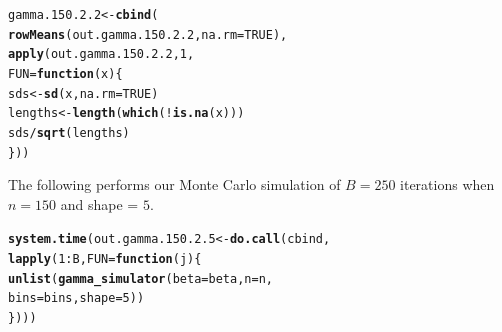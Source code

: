\documentclass[11pt]{article}\usepackage[]{graphicx}\usepackage[]{color}
\makeatletter
\newcommand{\hlnum}[1]{\textcolor[rgb]{0.686,0.059,0.569}{#1}}%
\newcommand{\hlopt}[1]{\textcolor[rgb]{0,0,0}{#1}}%
\newcommand{\hlstd}[1]{\textcolor[rgb]{0.345,0.345,0.345}{#1}}%
\newcommand{\hlkwa}[1]{\textcolor[rgb]{0.161,0.373,0.58}{\textbf{#1}}}%
\newcommand{\hlkwb}[1]{\textcolor[rgb]{0.69,0.353,0.396}{#1}}%
\newcommand{\hlkwc}[1]{\textcolor[rgb]{0.333,0.667,0.333}{#1}}%
\newcommand{\hlkwd}[1]{\textcolor[rgb]{0.737,0.353,0.396}{\textbf{#1}}}%
\newenvironment{kframe}{%
 \def\at@end@of@kframe{}%
 \ifinner\ifhmode%
  \def\at@end@of@kframe{\end{minipage}}%
  \begin{minipage}{\columnwidth}%
 \fi\fi%
 \def\FrameCommand##1{\hskip\@totalleftmargin \hskip-\fboxsep
 \colorbox{shadecolor}{##1}\hskip-\fboxsep
     \hskip-\linewidth \hskip-\@totalleftmargin \hskip\columnwidth}%
 \MakeFramed {\advance\hsize-\width
   \@totalleftmargin\z@ \linewidth\hsize
   \@setminipage}}%
 {\par\unskip\endMakeFramed%
 \at@end@of@kframe}
\newenvironment{knitrout}{}{} %
\makeatother
\begin{document}
\begin{knitrout}
\color{fgcolor}\begin{kframe}
\begin{alltt}
\hlstd{gamma.150.2.2} \hlkwb{<-} \hlkwd{cbind}\hlstd{(}
  \hlkwd{rowMeans}\hlstd{(out.gamma.150.2.2,} \hlkwc{na.rm} \hlstd{=} \hlnum{TRUE}\hlstd{),}
  \hlkwd{apply}\hlstd{(out.gamma.150.2.2,} \hlnum{1}\hlstd{,}
  \hlkwc{FUN} \hlstd{=} \hlkwa{function}\hlstd{(}\hlkwc{x}\hlstd{)\{}
    \hlstd{sds} \hlkwb{<-} \hlkwd{sd}\hlstd{(x,} \hlkwc{na.rm} \hlstd{=} \hlnum{TRUE}\hlstd{)}
    \hlstd{lengths} \hlkwb{<-} \hlkwd{length}\hlstd{(}\hlkwd{which}\hlstd{(}\hlopt{!}\hlkwd{is.na}\hlstd{(x)))}
    \hlstd{sds} \hlopt{/} \hlkwd{sqrt}\hlstd{(lengths)}
  \hlstd{\}))}
\end{alltt}


{\ttfamily\noindent\bfseries\color{errorcolor}{\#\# Error in is.data.frame(x): object 'out.gamma.150.2.2' not found}}\end{kframe}
\end{knitrout}

The following performs our Monte Carlo simulation of $B = 250$ iterations 
when $n = 150$ and shape = $5$.

\begin{knitrout}
\color{fgcolor}\begin{kframe}
\begin{alltt}
\hlkwd{system.time}\hlstd{(out.gamma.150.2.5} \hlkwb{<-} \hlkwd{do.call}\hlstd{(cbind,}
  \hlkwd{lapply}\hlstd{(}\hlnum{1}\hlopt{:}\hlstd{B,} \hlkwc{FUN} \hlstd{=} \hlkwa{function}\hlstd{(}\hlkwc{j}\hlstd{)\{}
    \hlkwd{unlist}\hlstd{(}\hlkwd{gamma_simulator}\hlstd{(}\hlkwc{beta} \hlstd{= beta,} \hlkwc{n} \hlstd{= n,}
      \hlkwc{bins} \hlstd{= bins,} \hlkwc{shape} \hlstd{=} \hlnum{5}\hlstd{))}
\hlstd{\})))}
\end{alltt}


{\ttfamily\noindent\bfseries\color{errorcolor}{\#\# Error in eval(predvars, data, env): object 'x1' not found}}

{\ttfamily\noindent\itshape\color{messagecolor}{\#\# Timing stopped at: 0.002 0 0.002}}\end{kframe}
\end{knitrout}
\end{document}
